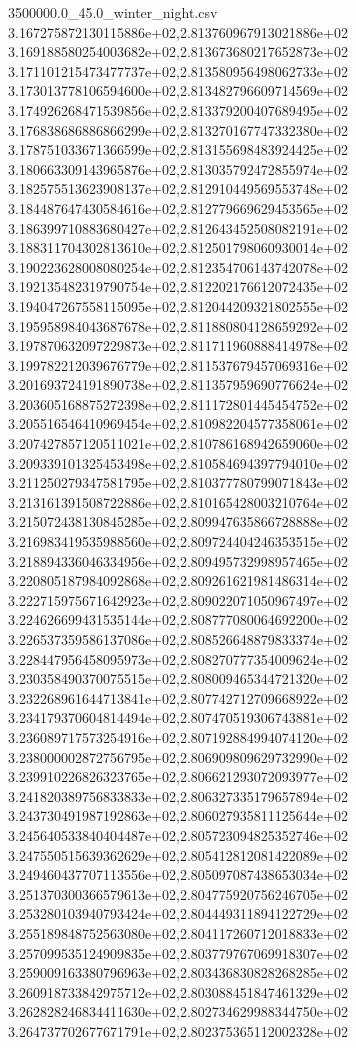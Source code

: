 \begin{filecontents*}{3500000.0_45.0_winter_night.csv}
3.167275872130115886e+02,2.813760967913021886e+02
3.169188580254003682e+02,2.813673680217652873e+02
3.171101215473477737e+02,2.813580956498062733e+02
3.173013778106594600e+02,2.813482796609714569e+02
3.174926268471539856e+02,2.813379200407689495e+02
3.176838686886866299e+02,2.813270167747332380e+02
3.178751033671366599e+02,2.813155698483924425e+02
3.180663309143965876e+02,2.813035792472855974e+02
3.182575513623908137e+02,2.812910449569553748e+02
3.184487647430584616e+02,2.812779669629453565e+02
3.186399710883680427e+02,2.812643452508082191e+02
3.188311704302813610e+02,2.812501798060930014e+02
3.190223628008080254e+02,2.812354706143742078e+02
3.192135482319790754e+02,2.812202176612072435e+02
3.194047267558115095e+02,2.812044209321802555e+02
3.195958984043687678e+02,2.811880804128659292e+02
3.197870632097229873e+02,2.811711960888414978e+02
3.199782212039676779e+02,2.811537679457069316e+02
3.201693724191890738e+02,2.811357959690776624e+02
3.203605168875272398e+02,2.811172801445454752e+02
3.205516546410969454e+02,2.810982204577358061e+02
3.207427857120511021e+02,2.810786168942659060e+02
3.209339101325453498e+02,2.810584694397794010e+02
3.211250279347581795e+02,2.810377780799071843e+02
3.213161391508722886e+02,2.810165428003210764e+02
3.215072438130845285e+02,2.809947635866728888e+02
3.216983419535988560e+02,2.809724404246353515e+02
3.218894336046334956e+02,2.809495732998957465e+02
3.220805187984092868e+02,2.809261621981486314e+02
3.222715975671642923e+02,2.809022071050967497e+02
3.224626699431535144e+02,2.808777080064692200e+02
3.226537359586137086e+02,2.808526648879833374e+02
3.228447956458095973e+02,2.808270777354009624e+02
3.230358490370075515e+02,2.808009465344721320e+02
3.232268961644713841e+02,2.807742712709668922e+02
3.234179370604814494e+02,2.807470519306743881e+02
3.236089717573254916e+02,2.807192884994074120e+02
3.238000002872756795e+02,2.806909809629732990e+02
3.239910226826323765e+02,2.806621293072093977e+02
3.241820389756833833e+02,2.806327335179657894e+02
3.243730491987192863e+02,2.806027935811125644e+02
3.245640533840404487e+02,2.805723094825352746e+02
3.247550515639362629e+02,2.805412812081422089e+02
3.249460437707113556e+02,2.805097087438653034e+02
3.251370300366579613e+02,2.804775920756246705e+02
3.253280103940793424e+02,2.804449311894122729e+02
3.255189848752563080e+02,2.804117260712018833e+02
3.257099535124909835e+02,2.803779767069918307e+02
3.259009163380796963e+02,2.803436830828268285e+02
3.260918733842975712e+02,2.803088451847461329e+02
3.262828246834411630e+02,2.802734629988344750e+02
3.264737702677671791e+02,2.802375365112002328e+02

\end{filecontents*}
